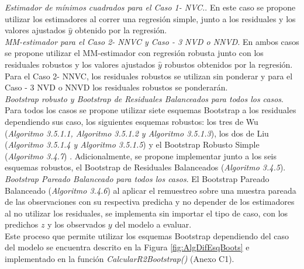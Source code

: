 \textit{Estimador de mínimos cuadrados para el Caso 1- NVC.}. En este caso se propone utilizar los estimadores al correr una regresión simple, junto a los residuales y los valores ajustados $\hat{y}$ obtenido por la regresión.\\


\textit{MM-estimador para el Caso 2- NNVC y  Caso - 3 NVD o NNVD}. En ambos casos se propone utilizar el MM-estimador con regresión robusta junto con los residuales robustos y los valores ajustados $\hat{y}$ robustos obtenidos por la regresión. Para el Caso 2- NNVC, los residuales robustos se utilizan sin ponderar y para el  Caso - 3 NVD o NNVD los residuales robustos se ponderarán.  \\



\textit{Bootstrap robusto y Bootstrap de Residuales Balanceados para todos los casos}. Para todos los casos se propone utilizar siete esquemas Bootstrap a los residuales dependiendo sus caso, los siguientes esquemas robustos: los tres de Wu (\textit{Algoritmo 3.5.1.1, Algoritmo 3.5.1.2 y Algoritmo 3.5.1.3}), los dos de Liu (\textit{Algoritmo 3.5.1.4 y Algoritmo 3.5.1.5}) y el Bootstrap Robusto Simple (\textit{Algoritmo 3.4.7}) . Adicionalmente, se propone implementar junto a los seis esquemas robustos, el Bootstrap de Residuales Balanceados (\textit{Algoritmo 3.4.5}). \\


\textit{Bootstrap Pareado Balanceado para todos los casos}. El Bootstrap Pareado Balanceado (\textit{Algoritmo 3.4.6}) al aplicar el remuestreo sobre una muestra pareada de las observaciones con su respectiva predicha y no depender de los estimadores al no utilizar los residuales, se implementa sin importar el tipo de caso, con los predichos $z$ y los observados $y$ del modelo a evaluar.\\

Este proceso que permite utilizar los esquemas Bootstrap dependiendo del caso del modelo se encuentra descrito en la Figura \ref{fig:AlgDifEsqBoots} e implementado en la función \textit{CalcularR2Bootstrap()} (Anexo C1).

 

